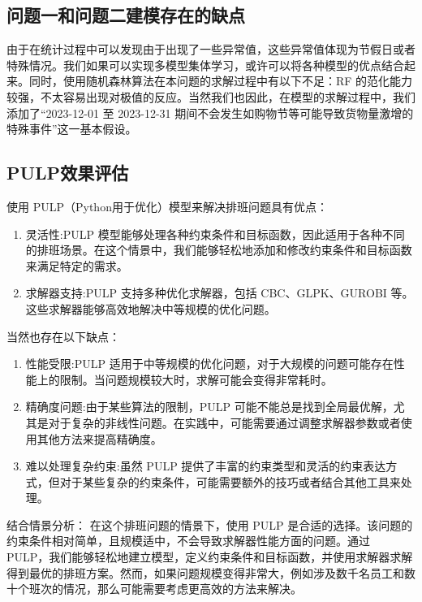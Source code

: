\documentclass[UTF8]{article}%
\begin{document}
\subsection{问题一和问题二建模存在的缺点}
由于在统计过程中可以发现由于出现了一些异常值，这些异常值体现为节假日或者特殊情况。我们如果可以实现多模型集体学习，或许可以将各种模型的优点结合起来。同时，使用随机森林算法在本问题的求解过程中有以下不足：RF 的范化能力较强，不太容易出现对极值的反应。当然我们也因此，在模型的求解过程中，我们添加了“2023-12-01 至 2023-12-31 期间不会发生如购物节等可能导致货物量激增的特殊事件”这一基本假设。



\subsection{PULP效果评估}

使用 PULP（Python用于优化）模型来解决排班问题具有优点：
\begin{enumerate}
    \item 灵活性:PULP 模型能够处理各种约束条件和目标函数，因此适用于各种不同的排班场景。在这个情景中，我们能够轻松地添加和修改约束条件和目标函数来满足特定的需求。
    \item 求解器支持:PULP 支持多种优化求解器，包括 CBC、GLPK、GUROBI 等。这些求解器能够高效地解决中等规模的优化问题。
\end{enumerate}


当然也存在以下缺点：
\begin{enumerate}
    \item 性能受限:PULP 适用于中等规模的优化问题，对于大规模的问题可能存在性能上的限制。当问题规模较大时，求解可能会变得非常耗时。
    \item 精确度问题:由于某些算法的限制，PULP 可能不能总是找到全局最优解，尤其是对于复杂的非线性问题。在实践中，可能需要通过调整求解器参数或者使用其他方法来提高精确度。
    \item 难以处理复杂约束:虽然 PULP 提供了丰富的约束类型和灵活的约束表达方式，但对于某些复杂的约束条件，可能需要额外的技巧或者结合其他工具来处理。
\end{enumerate}



结合情景分析：
在这个排班问题的情景下，使用 PULP 是合适的选择。该问题的约束条件相对简单，且规模适中，不会导致求解器性能方面的问题。通过 PULP，我们能够轻松地建立模型，定义约束条件和目标函数，并使用求解器求解得到最优的排班方案。然而，如果问题规模变得非常大，例如涉及数千名员工和数十个班次的情况，那么可能需要考虑更高效的方法来解决。
\end{document}
